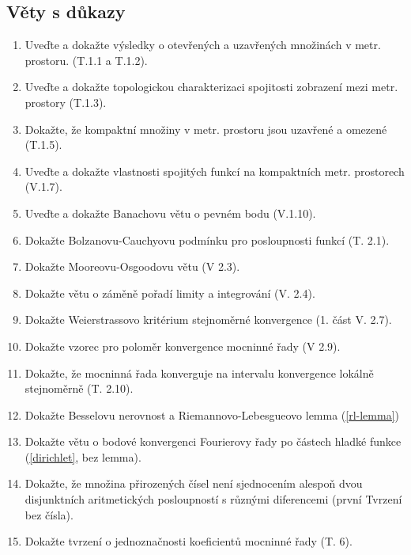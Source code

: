 \documentclass[a4paper,10pt]{article}
\begin{document}
\subsection{Věty s důkazy}
\setcounter{equation}{0}
\begin{enumerate}
\item Uveďte a dokažte výsledky o otevřených a uzavřených množinách v 
metr. prostoru. (T.1.1 a T.1.2).
\item Uveďte a dokažte topologickou charakterizaci spojitosti zobrazení 
mezi metr. prostory (T.1.3).
\item Dokažte, že kompaktní množiny v metr. prostoru jsou uzavřené a 
omezené (T.1.5).
\item Uveďte a dokažte vlastnosti spojitých funkcí na kompaktních 
metr. prostorech (V.1.7).
\item Uveďte a dokažte Banachovu větu o pevném bodu (V.1.10). 
\item Dokažte Bolzanovu-Cauchyovu podmínku pro posloupnosti funkcí (T. 2.1).
\item Dokažte Mooreovu-Osgoodovu větu (V 2.3). 
\item Dokažte větu o záměně pořadí limity a integrování (V. 2.4).
\item Dokažte Weierstrassovo kritérium stejnoměrné konvergence (1. část V. 2.7).
\item Dokažte vzorec pro poloměr konvergence mocninné řady (V 2.9).  
\item Dokažte, že mocninná řada konverguje na intervalu konvergence 
lokálně stejnoměrně (T. 2.10).
\item Dokažte Besselovu nerovnost a Riemannovo-Lebesgueovo lemma
(\ref{rl-lemma}) 
\item Dokažte větu o bodové konvergenci Fourierovy řady po částech hladké funkce 
(\ref{dirichlet}, bez lemma). 
\item Dokažte, že množina přirozených čísel není sjednocením alespoň dvou 
disjunktních aritmetických posloupností s různými diferencemi (první Tvrzení
bez čísla).
\item Dokažte tvrzení o jednoznačnosti koeficientů mocninné řady (T. 6).
\end{enumerate}
\end{document}
